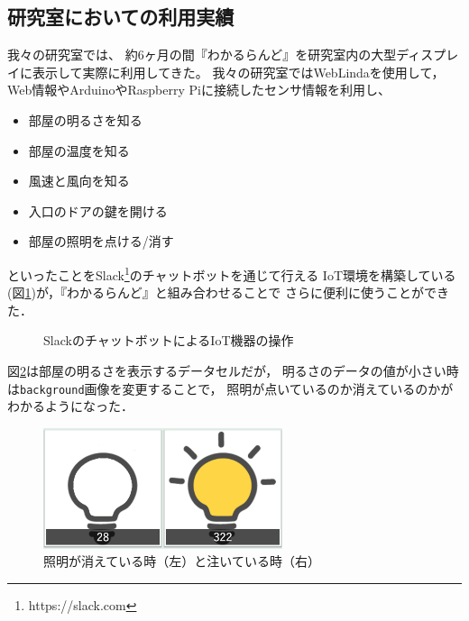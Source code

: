 \subsection{研究室においての利用実績}
我々の研究室では、
約6ヶ月の間『わかるらんど』を研究室内の大型ディスプレイに表示して実際に利用してきた。
我々の研究室ではWebLindaを使用して，
Web情報やArduinoやRaspberry Piに接続したセンサ情報を利用し、
\begin{itemize}
\item 部屋の明るさを知る
\item 部屋の温度を知る
\item 風速と風向を知る
\item 入口のドアの鍵を開ける
\item 部屋の照明を点ける/消す
\end{itemize}
といったことをSlack\footnote{https://slack.com}のチャットボットを通じて行える
IoT環境を構築している(図\ref{slack})が，『わかるらんど』と組み合わせることで
さらに便利に使うことができた．

\begin{figure}[h]
\centering
{}
\caption{SlackのチャットボットによるIoT機器の操作}
\label{slack}
\end{figure}

図\ref{light}は部屋の明るさを表示するデータセルだが，
明るさのデータの値が小さい時は\texttt{background}画像を変更することで，
照明が点いているのか消えているのかがわかるようになった．

\begin{figure}[h]
\centering
\includegraphics[width=7cm]{images/light.png}
\caption{照明が消えている時（左）と注いている時（右）}
\label{light}
\end{figure}

